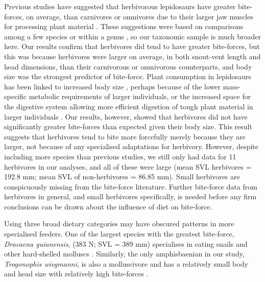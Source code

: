 \documentclass[a4paper, 12pt]{article}
\begin{document}
Previous studies have suggested that herbivorous lepidosaurs have greater bite-forces, on average, than carnivores or omnivores due to their larger jaw muscles for processing plant material \citep{metzger2005correlations,cooper2002distribution,herrel1999morphology,herrel1999sexual,herrel2004omnivory,Herrel2008,herrel2014does}.
These suggestions were based on comparisons among a few species \citep[e.g.][]{herrel2014does,herrel2004omnivory} or within a genus \citep[e.g.][]{lopez2015sex}, so our taxonomic sample is much broader here. 
Our results confirm that herbivores did tend to have greater bite-forces, but this was because herbivores were larger on average, in both snout-vent length and head dimensions, than their carnivorous or omnivorous counterparts, and body size was the strongest predictor of bite-force. 
Plant consumption in lepidosaurs has been linked to increased body size \citep{cooper2002distribution,herrel2014does,metzger2005correlations}, perhaps because of the lower mass-specific metabolic requirements of larger individuals, or the increased space for the digestive system allowing more efficient digestion of tough plant material in larger individuals \citep{herrel2014does,espinoza2004recurrent,iverson1980colic}.
Our results, however, showed that herbivores did not have significantly greater bite-forces than expected given their body size. This result suggests that herbivores tend to bite more forcefully merely because they are larger, not because of any specialised adaptations for herbivory. 
However, despite including more species than previous studies, we still only had data for 11 herbivores in our analyses, and all of these were large (mean SVL herbivores = 192.8 mm; mean SVL of non-herbivores = 86.85 mm). 
Small herbivores \citep[for example various species within Leiolaemidae; average SVL $<$ 100 mm; ][]{espinoza2004recurrent} are conspicuously missing from the bite-force literature. 
Further bite-force data from herbivores in general, and small herbivores specifically, is needed before any firm conclusions can be drawn about the influence of diet on bite-force. 

Using three broad dietary categories \citep[from][]{meiri2018traits} may have obscured patterns in more specialised feeders. 
One of the largest species with the greatest bite-force, \textit{Dracaena guianensis}, (383 N; SVL = 389 mm) specialises in eating snails and other hard-shelled molluscs \citep{dalrymple1979jaw,colli1998new}.
Similarly, the only amphisbaenian in our study, \textit{Trogonophis wiegmanni}, is also a molluscivore and has a relatively small body and head size with relatively high bite-forces \citep[8 N; SVL = 156.36 mm; ][]{baeckens2017fossorial}.
\end{document}

